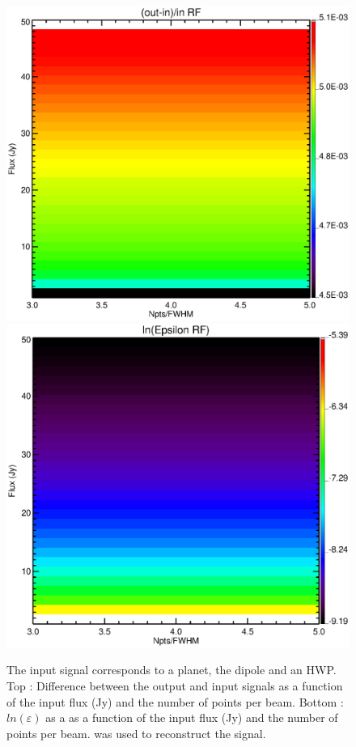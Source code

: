 \begin{figure}[h]
\center
	\includegraphics[scale=0.5]{Figures/diff_rf_planet_hwp_dipole.eps}
	\includegraphics[scale=0.5]{Figures/epsilon_rf_planet_hwp_dipole.eps}
	\caption{The input signal corresponds to a planet, the dipole and an HWP. Top : Difference between the output and input signals as a function of the input flux (Jy) and the number of points per beam. Bottom : $ln(\varepsilon)$ as a as a function of the input flux (Jy) and the number of points per beam. \rf was used to reconstruct the signal.}
	\label{fig:epsilon-rf-planet-hwp-dipole}
\end{figure}

